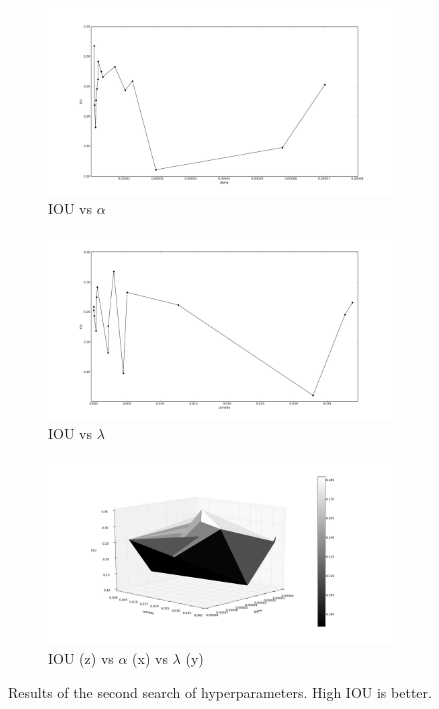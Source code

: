 \begin{figure}[h]
	\centering
	\begin{subfigure}{0.32\textwidth}
		\centering
                \includegraphics[width=\textwidth]{plots/hs2_alpha.png}
         \caption{IOU vs $\alpha$}
	\end{subfigure}
	\begin{subfigure}{0.32\textwidth}
		\centering
                \includegraphics[width=\textwidth]{plots/hs2_lambda.png}
         \caption{IOU vs $\lambda$}
	\end{subfigure}
	\begin{subfigure}{0.32\textwidth}
		\centering
                \includegraphics[width=\textwidth]{plots/hs2_trisurface.png}
         \caption{IOU (z) vs $\alpha$ (x) vs $\lambda$ (y)}
	\end{subfigure}
	\caption[Second hyperparameter search for Experiment 1]{Results of the second search of hyperparameters. High IOU is better.}
	 \label{fig:Hs2}
\end{figure}

